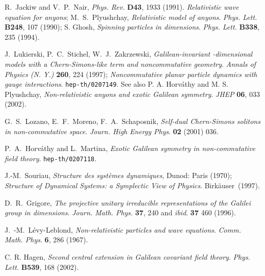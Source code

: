 \documentclass[a4paper,11pt]{article}
\begin{document}
\begin{thebibliography}{99}
R.~Jackiw and V.~P.~Nair,
{\sl Phys. Rev.} {\bf D43}, 1933 (1991).
{\it Relativistic wave equation for anyons};
M.~S.~Plyushchay,
{\it Relativistic model of anyons}.
{\sl Phys. Lett.} {\bf B248}, 107 (1990);
S. Ghosh, {\it Spinning particles in \coordHE{} dimensions}.
{\sl Phys. Lett.} {\bf B338}, 235 (1994).

   J.~Lukierski, P.~C.~Stichel, W.~J.~Zakrzewski,
    {\it Galilean-invariant \coordHE{}-dimensional models with a
      Chern-Simons-like term and \coordHE{} noncommutative geometry}.
   {\sl Annals of Physics (N. Y.)} {\bf 260}, 224 (1997);
   {\it Noncommutative planar particle dynamics with gauge
    interactions}. \texttt{hep-th/0207149}. See also
   P. A. Horv\'athy and M. S. Plyushchay,
   {\it Non-relativistic anyons and exotic Galilean symmetry}.
   {\sl JHEP} {\bf 06}, 033 (2002). %

G.~S.~Lozano, E.~F.~Moreno, F.~A.~Schaposnik,
  {\it Self-dual Chern-Simons solitons in non-commutative space}.
{\sl Journ. High Energy Phys}. {\bf 02} (2001) 036.

P.~A.~Horv\'athy and L.~Martina,
{\it Exotic Galilean symmetry in non-commutative field theory}.
\texttt{hep-th/0207118}.


J.-M.~Souriau,
{\it Structure des syst\`emes dynamiques},
Dunod: Paris (1970);
{\it Structure of Dynamical Systems: a Symplectic View of Physics}.
Birk\"auser~(1997).

D.~R.~Grigore,
   {\it The projective unitary irreducible representations of the
    Galilei group in \coordHE{} dimensions}.
   {\sl Journ. Math. Phys.} {\bf 37}, 240 and
   {\sl ibid}. {\bf 37} 460 (1996).

J.~-M.~L\'evy-Leblond,
{\it Non-relativistic particles and wave equations}.
{\sl Comm. Math. Phys}. {\bf 6}, 286 (1967).

C. R. Hagen,
{\it Second central extension in Galilean covariant field theory}.
{\sl Phys. Lett.} {\bf B539}, 168 (2002).


\end{thebibliography}
\end{document}
